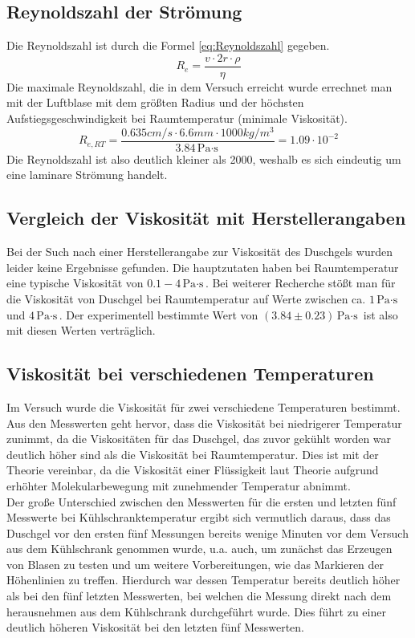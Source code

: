 \documentclass{report}
\begin{document}
\subsection{Reynoldszahl der Strömung}
Die Reynoldszahl ist durch die Formel \ref{eq:Reynoldszahl} gegeben.
\begin{equation}
    R_e = \frac{v \cdot 2r \cdot \rho}{\eta}
    \label{eq:Reynoldszahl}
\end{equation}
Die maximale Reynoldszahl, die in dem Versuch erreicht wurde errechnet man mit der Luftblase mit dem größten Radius und der höchsten 
Aufstiegsgeschwindigkeit bei Raumtemperatur (minimale Viskosität). 
\begin{equation}
    R_{e, RT} = \frac{0.635cm/s \cdot 6.6mm \cdot 1000kg/m^3}{3.84\si{\Pa \cdot \s}} = 1.09 \cdot 10^{-2}
\end{equation}
Die Reynoldszahl ist also deutlich kleiner als 2000, weshalb es sich eindeutig um eine laminare Strömung handelt.

\subsection{Vergleich der Viskosität mit Herstellerangaben}
Bei der Such nach einer Herstellerangabe zur Viskosität des Duschgels wurden leider keine Ergebnisse gefunden. Die hauptzutaten haben bei Raumtemperatur eine typische
Viskosität von $0.1-4 \si{\Pa \cdot \s}$. Bei weiterer Recherche stößt man für die Viskosität von Duschgel bei Raumtemperatur auf Werte zwischen ca. $1 \si{\Pa \cdot \s}$ und $4 \si{\Pa \cdot \s}$.
Der experimentell bestimmte Wert von $(3.84 \pm 0.23) \si{\Pa \cdot \s}$ ist also mit diesen Werten verträglich.

\subsection{Viskosität bei verschiedenen Temperaturen}
Im Versuch wurde die Viskosität für zwei verschiedene Temperaturen bestimmt.
Aus den Messwerten geht hervor, dass die Viskosität bei niedrigerer Temperatur zunimmt, da die Viskositäten für das Duschgel, das zuvor gekühlt worden war deutlich höher sind als die Viskosität bei Raumtemperatur.
Dies ist mit der Theorie vereinbar, da die Viskosität einer Flüssigkeit laut Theorie aufgrund erhöhter Molekularbewegung mit zunehmender Temperatur abnimmt. \\ 
Der große Unterschied zwischen den Messwerten für die ersten und letzten fünf Messwerte bei Kühlschranktemperatur ergibt sich vermutlich daraus, dass das Duschgel vor den ersten fünf Messungen bereits wenige Minuten vor dem Versuch aus dem Kühlschrank genommen wurde, u.a. auch,
um zunächst das Erzeugen von Blasen zu testen und um weitere Vorbereitungen, wie das Markieren der Höhenlinien zu treffen. Hierdurch war dessen Temperatur bereits deutlich höher als bei den fünf letzten Messwerten, bei welchen die Messung direkt nach 
dem herausnehmen aus dem Kühlschrank durchgeführt wurde. Dies führt zu einer deutlich höheren Viskosität bei den letzten fünf Messwerten.
\end{document}
